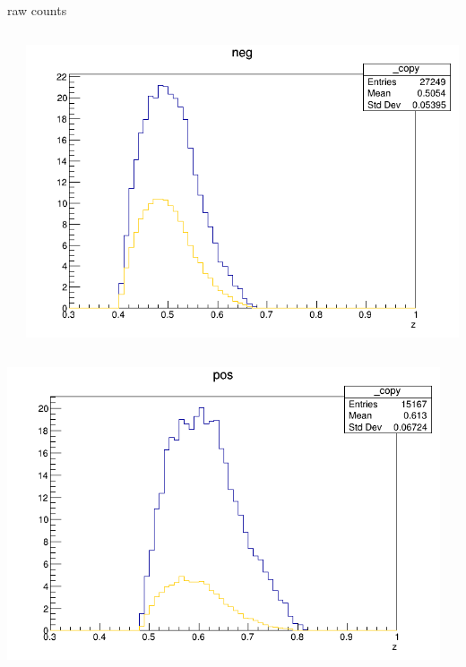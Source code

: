 \begin{frame}{raw counts}
\begin{columns}
\begin{column}[T]{0.25\textwidth}
\end{column}
\begin{column}[T]{0.25\textwidth}
\includegraphics[width = \textwidth]{results/yield/statistics/yield_x_Q2_z_0.50_3.979_0.50_neg.png}
\end{column}
\end{columns}
\begin{columns}
\begin{column}[T]{0.25\textwidth}
\includegraphics[width = \textwidth]{results/yield/statistics/yield_x_Q2_z_0.50_3.979_0.60_pos.png}
\end{column}
\begin{column}[T]{0.25\textwidth}

\end{column}
\end{columns}
\end{frame}
